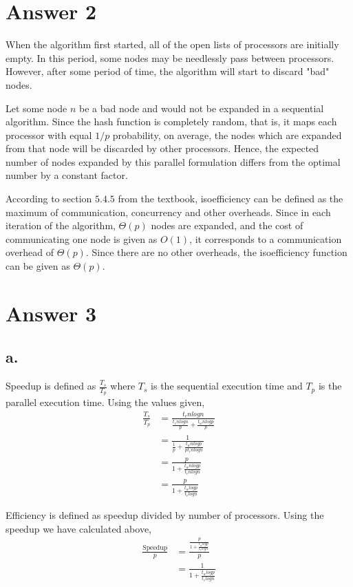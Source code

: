 \documentclass[11pt]{article}
\begin{document}
\section*{Answer 2}
When the algorithm first started, all of the open lists of processors are initially
    empty. In this period, some nodes may be needlessly pass between processors.
    However, after some period of time, the algorithm will start to discard "bad"
    nodes.
    
Let some node $n$ be a bad node and would not be expanded in a sequential algorithm.
    Since the hash function is completely random, that is, it maps each processor with
    equal $1/p$ probability, on average, the nodes which are expanded from that node
    will be discarded by other processors. Hence, the expected number of nodes
    expanded by this parallel formulation differs from the optimal number by a
    constant factor.
    
According to section $5.4.5$ from the textbook, isoefficiency can be defined as the
    maximum of communication, concurrency and other overheads. Since in each iteration
    of the algorithm, $\Theta(p)$ nodes are expanded, and the cost of communicating
    one node is given as $O(1)$, it corresponds to a communication overhead of
    $\Theta(p)$. Since there are no other overheads, the isoefficiency function
    can be given as $\Theta(p)$.
\section*{Answer 3}
\subsection*{a.}
Speedup is defined as $\frac{T_s}{T_p}$ where $T_s$ is the sequential execution time and
    $T_p$ is the parallel execution time. Using the values given,
    \begin{align*}
        \frac{T_s}{T_p} &= \frac{t_cnlogn}{\frac{t_cnlogn}{p}+\frac{t_wnlogp}{p}}\\
        &= \frac{1}{\frac{1}{p}+\frac{t_wnlogp}{pt_cnlogn}} \\
        &= \frac{p}{1+\frac{t_wnlogp}{t_cnlogn}}\\
        &= \frac{p}{1+\frac{t_wlogp}{t_clogn}}
    \end{align*}
    
Efficiency is defined as speedup divided by number of processors. Using the speedup we
    have calculated above,
    \begin{align*}
        \frac{\text{Speedup}}{p} &= \frac{\frac{p}{1+\frac{t_wlogp}{t_clogn}}}{p} \\
        &= \frac{1}{1+\frac{t_wlogp}{t_clogn}}
    \end{align*}
    
\end{document}
